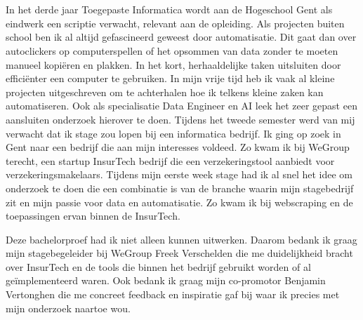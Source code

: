 
\chapter*{}
\label{ch:voorwoord}

In het derde jaar Toegepaste Informatica wordt aan de Hogeschool Gent als eindwerk een scriptie verwacht, relevant aan de opleiding. Als projecten buiten school ben ik al altijd gefascineerd geweest door automatisatie. Dit gaat dan over autoclickers op computerspellen of het opsommen van data zonder te moeten manueel kopiëren en plakken. In het kort, herhaaldelijke taken uitsluiten door efficiënter een computer te gebruiken. In mijn vrije tijd heb ik vaak al kleine projecten uitgeschreven om te achterhalen hoe ik telkens kleine zaken kan automatiseren. Ook als specialisatie Data Engineer en AI leek het zeer gepast een aansluiten onderzoek hierover te doen. Tijdens het tweede semester werd van mij verwacht dat ik stage zou lopen bij een informatica bedrijf. Ik ging op zoek in Gent naar een bedrijf die aan mijn interesses voldeed. Zo kwam ik bij WeGroup terecht, een startup InsurTech bedrijf die een verzekeringstool aanbiedt voor verzekeringsmakelaars. Tijdens mijn eerste week stage had ik al snel het idee om onderzoek te doen die een combinatie is van de branche waarin mijn stagebedrijf zit en mijn passie voor data en automatisatie. Zo kwam ik bij webscraping en de toepassingen ervan binnen de InsurTech.

Deze bachelorproef had ik niet alleen kunnen uitwerken. Daarom bedank ik graag mijn stagebegeleider bij WeGroup Freek Verschelden die me duidelijkheid bracht over InsurTech en de tools die binnen het bedrijf gebruikt worden of al geïmplementeerd waren.
Ook bedank ik graag mijn co-promotor Benjamin Vertonghen die me concreet feedback en inspiratie gaf bij waar ik precies met mijn onderzoek naartoe wou.


